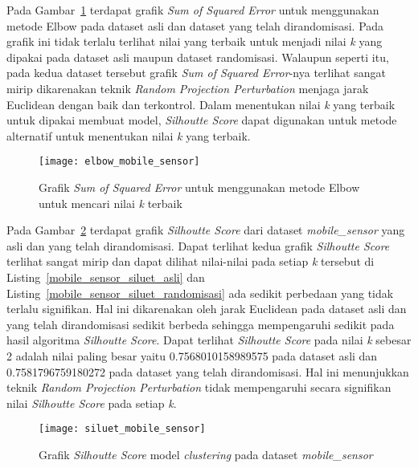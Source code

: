 Pada Gambar~\ref{fig:elbow_mobile_sensor} terdapat grafik \textit{Sum of Squared Error} untuk menggunakan metode Elbow pada dataset asli dan dataset yang telah dirandomisasi. Pada grafik ini tidak terlalu terlihat nilai yang terbaik untuk menjadi nilai \textit{k} yang dipakai pada dataset asli maupun dataset randomisasi. Walaupun seperti itu, pada kedua dataset tersebut grafik \textit{Sum of Squared Error}-nya terlihat sangat mirip dikarenakan teknik \textit{Random Projection Perturbation} menjaga jarak Euclidean dengan baik dan terkontrol. Dalam menentukan nilai \textit{k} yang terbaik untuk dipakai membuat model, \textit{Silhoutte Score} dapat digunakan untuk metode alternatif untuk menentukan nilai \textit{k} yang terbaik.

\begin{figure}
	\centering
	\texttt{[image: elbow\_mobile\_sensor]}
	\caption{Grafik \textit{Sum of Squared Error} untuk menggunakan metode Elbow untuk mencari nilai \textit{k} terbaik}
	\label{fig:elbow_mobile_sensor}
\end{figure}

Pada Gambar~\ref{fig:siluet_mobile_sensor} terdapat grafik \textit{Silhoutte Score} dari dataset \textit{mobile\_sensor} yang asli dan yang telah dirandomisasi. Dapat terlihat kedua grafik \textit{Silhoutte Score} terlihat sangat mirip dan dapat dilihat nilai-nilai pada setiap \textit{k} tersebut di Listing~\ref{mobile_sensor_siluet_asli} dan Listing~\ref{mobile_sensor_siluet_randomisasi} ada sedikit perbedaan yang tidak terlalu signifikan. Hal ini dikarenakan oleh jarak Euclidean pada dataset asli dan yang telah dirandomisasi sedikit berbeda sehingga mempengaruhi sedikit pada hasil algoritma \textit{Silhoutte Score}. Dapat terlihat \textit{Silhoutte Score} pada nilai \textit{k} sebesar 2 adalah nilai paling besar yaitu 0.7568010158989575 pada dataset asli dan 0.7581796759180272 pada dataset yang telah dirandomisasi. Hal ini menunjukkan teknik \textit{Random Projection Perturbation} tidak mempengaruhi secara signifikan nilai \textit{Silhoutte Score} pada setiap \textit{k}.

\begin{figure}
	\centering
	\texttt{[image: siluet\_mobile\_sensor]}
	\caption{Grafik \textit{Silhoutte Score} model \textit{clustering} pada dataset \textit{mobile\_sensor}}
	\label{fig:siluet_mobile_sensor}
\end{figure}
	
